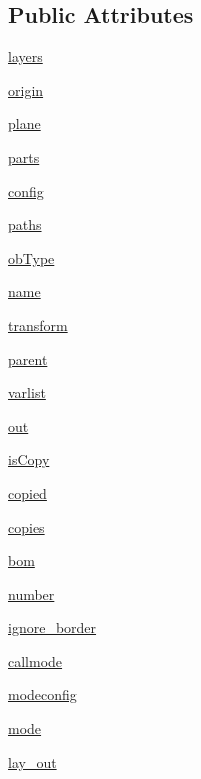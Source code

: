 \subsection*{Public Attributes}
\begin{DoxyCompactItemize}
\item 
\hyperlink{classpath_1_1_plane_a6f7241b4f23c72b0608ca6b713d5d281}{layers}
\item 
\hyperlink{classpath_1_1_plane_a07fffbf7ef837b7f8a0d9e2a69161e1b}{origin}
\item 
\hyperlink{classpath_1_1_plane_aa10bd618cd80d3ee1fe348a94b173736}{plane}
\item 
\hyperlink{classpath_1_1_plane_a57144197eff51c6e23a38a1d28541f8f}{parts}
\item 
\hyperlink{classpath_1_1_plane_a9c3565a0c72c585ffd3d9305d9e59b64}{config}
\item 
\hyperlink{classpath_1_1_plane_acf3722b8287fdbdca683bd82ef536201}{paths}
\item 
\hyperlink{classpath_1_1_plane_a52d1301106910689f429002086854c0b}{ob\+Type}
\item 
\hyperlink{classpath_1_1_plane_a83242faa5f70bd6aa867c977d4f4a6c1}{name}
\item 
\hyperlink{classpath_1_1_plane_a2fa8b34d6558289254bb548239672db0}{transform}
\item 
\hyperlink{classpath_1_1_plane_ae45a5caa84aa06a12b132b98a4bf7b5d}{parent}
\item 
\hyperlink{classpath_1_1_plane_a17bfb0110c1141d362eb715129058fa4}{varlist}
\item 
\hyperlink{classpath_1_1_plane_a70c65dfa7270b5c4cbc1d15c513df3d8}{out}
\item 
\hyperlink{classpath_1_1_plane_ab7c505d0f7c91a505f8cc786504f1cc2}{is\+Copy}
\item 
\hyperlink{classpath_1_1_plane_a71f825ab207c8a45abb6c6e25551b949}{copied}
\item 
\hyperlink{classpath_1_1_plane_a67fb6a225b9da98f1074711105499db9}{copies}
\item 
\hyperlink{classpath_1_1_plane_aa499e661977ffef2655b5c844eba30e3}{bom}
\item 
\hyperlink{classpath_1_1_plane_ab3693d278c25eb3183f1e87b4d478ca9}{number}
\item 
\hyperlink{classpath_1_1_plane_aeb4647226d990dcc53bd09a27dad388a}{ignore\+\_\+border}
\item 
\hyperlink{classpath_1_1_plane_aa0494eb77e5605add3fd16367d9cc91d}{callmode}
\item 
\hyperlink{classpath_1_1_plane_ac23023bbc6c9f6a3726c40466a0e0e71}{modeconfig}
\item 
\hyperlink{classpath_1_1_plane_acd9711469d21f4785a72a27794f625cf}{mode}
\item 
\hyperlink{classpath_1_1_plane_ae77d75fa4cfaf2141bc464e079e64ef8}{lay\+\_\+out}
\end{DoxyCompactItemize}


